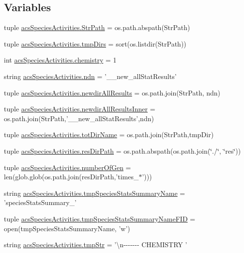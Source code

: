 \subsection*{Variables}
\begin{DoxyCompactItemize}
\item 
tuple \hyperlink{a00097_a05f0f829ce4df27678aa19d4e5f10c54}{acs\-Species\-Activities.\-Str\-Path} = os.\-path.\-abspath(Str\-Path)
\item 
tuple \hyperlink{a00097_addf4c61c6afe70a2ea39931695ddc36b}{acs\-Species\-Activities.\-tmp\-Dirs} = sort(os.\-listdir(Str\-Path))
\item 
int \hyperlink{a00097_a5459c566e6ccdf02747a3c16089a5593}{acs\-Species\-Activities.\-chemistry} = 1
\item 
string \hyperlink{a00097_ad2a87ed28d0f42525ce49c390f390298}{acs\-Species\-Activities.\-ndn} = '\-\_\-\_\-new\-\_\-all\-Stat\-Results'
\item 
tuple \hyperlink{a00097_a4fc28291b7f61ee2fa8969fa7a690ba2}{acs\-Species\-Activities.\-newdir\-All\-Results} = os.\-path.\-join(Str\-Path, ndn)
\item 
tuple \hyperlink{a00097_ae77a5ce35739a29f29f9df698d91f1c9}{acs\-Species\-Activities.\-newdir\-All\-Results\-Inner} = os.\-path.\-join(Str\-Path,'\-\_\-\_\-new\-\_\-all\-Stat\-Results',ndn)
\item 
tuple \hyperlink{a00097_aa71c948cf1d0699207eafcd30beb394e}{acs\-Species\-Activities.\-tot\-Dir\-Name} = os.\-path.\-join(Str\-Path,tmp\-Dir)
\item 
tuple \hyperlink{a00097_a2c1728d3ec9815ec7cf41653e953524c}{acs\-Species\-Activities.\-res\-Dir\-Path} = os.\-path.\-abspath(os.\-path.\-join(\char`\"{}./\char`\"{}, \char`\"{}res\char`\"{}))
\item 
tuple \hyperlink{a00097_acceae37ca98ccf6dc25c9f538fda386f}{acs\-Species\-Activities.\-number\-Of\-Gen} = len(glob.\-glob(os.\-path.\-join(res\-Dir\-Path,'times\-\_\-$\ast$')))
\item 
string \hyperlink{a00097_aceab16acbf85893dcacfcfd921c9da12}{acs\-Species\-Activities.\-tmp\-Species\-Stats\-Summary\-Name} = 'species\-Stats\-Summary\-\_\-'
\item 
tuple \hyperlink{a00097_a57b362cf15dda461a59c719a92177c3a}{acs\-Species\-Activities.\-tmp\-Species\-Stats\-Summary\-Name\-F\-I\-D} = open(tmp\-Species\-Stats\-Summary\-Name, 'w')
\item 
string \hyperlink{a00097_a81ab8133517c53adfcdf8129e24cf5d0}{acs\-Species\-Activities.\-tmp\-Str} = '\textbackslash{}n-\/-\/-\/-\/-\/-\/-\/ C\-H\-E\-M\-I\-S\-T\-R\-Y '

\end{DoxyCompactItemize}

